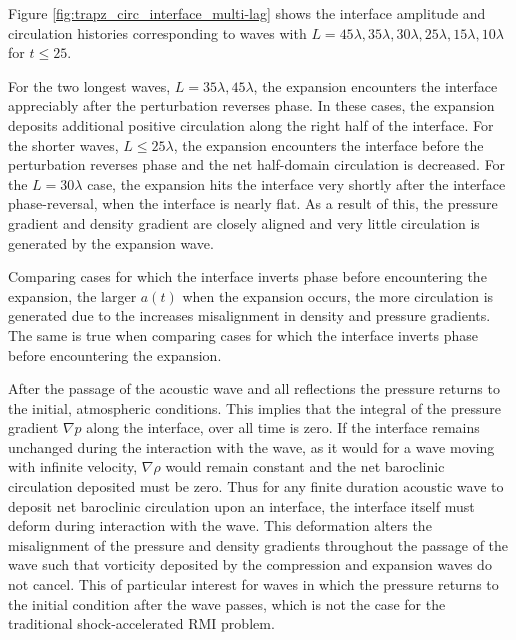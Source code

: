 Figure \ref{fig:trapz_circ_interface_multi-lag} shows the interface
amplitude and circulation histories corresponding to waves with
$L=45\lambda, 35\lambda ,30\lambda ,25\lambda ,15\lambda ,10\lambda$
for $t\leq 25$.

For the two longest waves, $L=35\lambda, 45\lambda$, the expansion
encounters the interface appreciably after the perturbation reverses
phase. In these cases, the expansion deposits additional positive
circulation along the right half of the interface. For the shorter
waves, $L \leq 25\lambda$, the expansion encounters the interface
before the perturbation reverses phase and the net half-domain
circulation is decreased. For the $L=30\lambda$ case, the expansion
hits the interface very shortly after the interface phase-reversal,
when the interface is nearly flat. As a result of this, the pressure
gradient and density gradient are closely aligned and very little
circulation is generated by the expansion wave.

Comparing cases for which the interface inverts phase before
encountering the expansion, the larger $a(t)$ when the expansion
occurs, the more circulation is generated due to the increases
misalignment in density and pressure gradients. The same is true when
comparing cases for which the interface inverts phase before
encountering the expansion.

After the passage of the acoustic wave and all reflections the
pressure returns to the initial, atmospheric conditions. This implies
that the integral of the pressure gradient $\nabla p$ along the
interface, over all time is zero. If the interface remains unchanged
during the interaction with the wave, as it would for a wave moving
with infinite velocity, $\nabla \rho$ would remain constant and the
net baroclinic circulation deposited must be zero. Thus for any finite
duration acoustic wave to deposit net baroclinic circulation upon an
interface, the interface itself must deform during interaction with
the wave. This deformation alters the misalignment of the pressure and
density gradients throughout the passage of the wave such that
vorticity deposited by the compression and expansion waves do not
cancel. This of particular interest for waves in which the pressure
returns to the initial condition after the wave passes, which is not
the case for the traditional shock-accelerated \ac{RMI} problem.


